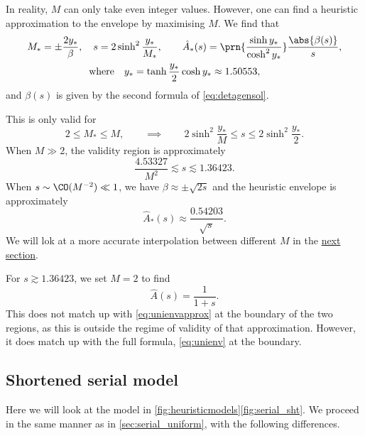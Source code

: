 \documentclass[12pt]{article}
\begin{document}
In reality, \(M\) can only take even integer values.
However, one can find a heuristic approximation to the envelope by maximising \wrt \(M\).
We find that
%
\begin{multline}\label{eq:unienv}
  M_* = \pm\frac{2y_*}{\beta},
  \quad
  s = 2\sinh^2\frac{y_*}{M_*},
  \qquad
  \hat{A}_*(s) = \prn{\frac{ \sinh y_* }{ \cosh^2 y_* }} 
      \frac{\abs{\beta(s)}}{s},
  \\ \text{where}\quad
  y_* = \tanh \frac{y_*}{2} \cosh y_* \approx 1.50553,
  \qquad
\end{multline}
%
and \(\beta(s)\) is given by the second formula of \cref{eq:detagensol}.

This is only valid for
%
\begin{equation}\label{eq:univalid}
  2 \leq M_* \leq M,
  \qquad\implies\qquad
  2\sinh^2 \frac{y_*}{M} \leq s \leq 2\sinh^2 \frac{y_*}{2}.
\end{equation}
%
When \(M \gg 2\), the validity region is approximately
%
\begin{equation}\label{eq:univalidapprox}
  \frac{4.53327}{M^2} \lesssim s \lesssim 1.36423.
\end{equation}
%
When \(s \sim \CO(M^{-2}) \ll 1\), we have \(\beta \approx \pm \sqrt{2s}\) and the heuristic envelope is approximately
%
\begin{equation}\label{eq:unienvapprox}
  \hat{A}_*(s) \approx \frac{ 0.54203 }{ \sqrt{s} }.
\end{equation}
%
We will lok at a more accurate interpolation between different \(M\) in the \hyperref[sec:serial_shorten]{next section}.

For \(s\gtrsim 1.36423\), we set \(M=2\) to find
%
\begin{equation}\label{eq:binaryenv}
  \hat{A}(s) = \frac{1}{1+s}.
\end{equation}
%
This does not match up with \eqref{eq:unienvapprox} at the boundary of the two regions, as this is outside the regime of validity of that approximation.
However, it does match up with the full formula, \eqref{eq:unienv} at the boundary.


\subsection{Shortened serial model}\label{sec:serial_shorten}


Here we will look at the model in \cref{fig:heuristicmodels}\ref{fig:serial_sht}.
We proceed in the same manner as in \cref{sec:serial_uniform}, with the following differences.
\end{document}
